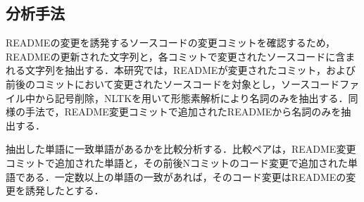 \documentclass[uplatex,dvipdfmx,a4paper,twocolumn,base=11pt,jbase=11pt,ja=standard]{bxjsarticle}  %
\newcommand{\todo}[1]{\colorbox{yellow}{{\bf TODO}:}{\color{red} {\textbf{[#1]}}}}
\begin{document}
\subsection{分析手法}


READMEの変更を誘発するソースコードの変更コミットを確認するため，READMEの更新された文字列と，各コミットで変更されたソースコードに含まれる文字列を抽出する．本研究では，READMEが変更されたコミット，および前後のコミットにおいて変更されたソースコードを対象とし，ソースコードファイル中から記号削除，NLTKを用いて形態素解析により名詞のみを抽出する．同様の手法で，README変更コミットで追加されたREADMEから名詞のみを抽出する．


%
%

抽出した単語に一致単語があるかを比較分析する．比較ペアは，README変更コミットで追加された単語と，その前後Nコミットのコード変更で追加された単語である．一定数以上の単語の一致があれば，そのコード変更はREADMEの変更を誘発したとする．

\end{document}
